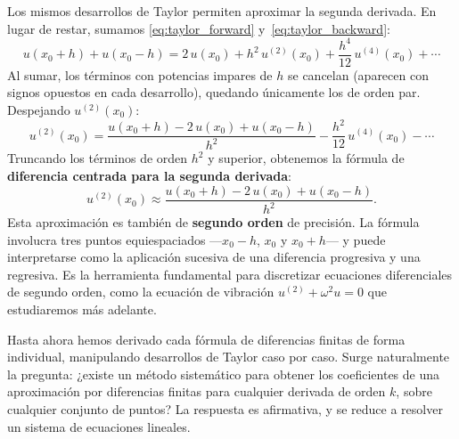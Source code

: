 Los mismos desarrollos de Taylor permiten aproximar la segunda derivada. En lugar de restar, sumamos
\eqref{eq:taylor_forward} y~\eqref{eq:taylor_backward}:
\begin{equation}
    u(x_0 + h) + u(x_0 - h) = 2\,u(x_0) + h^2\,u^{(2)}(x_{0}) + \frac{h^4}{12}\,u^{(4)}(x_{0}) + \cdots
    \label{eq:taylor_sum}
\end{equation}
Al sumar, los términos con potencias impares de $h$ se cancelan (aparecen con signos opuestos en cada desarrollo),
quedando únicamente los de orden par. Despejando $u^{(2)}(x_0)$:
\begin{equation}
    u^{(2)}(x_{0}) = \frac{u(x_0 + h) - 2\,u(x_0) + u(x_0 - h)}{h^2} - \frac{h^2}{12}\,u^{(4)}(x_{0}) - \cdots
    \label{eq:second_derivative_full}
\end{equation}
Truncando los términos de orden $h^2$ y superior, obtenemos la fórmula de \textbf{diferencia centrada para la segunda
    derivada}:
\begin{equation}
    u^{(2)}(x_{0}) \approx \frac{u(x_0 + h) - 2\,u(x_0) + u(x_0 - h)}{h^2}.
    \label{eq:centered_second_derivative}
\end{equation}
Esta aproximación es también de \textbf{segundo orden} de precisión. La fórmula involucra tres puntos equiespaciados
---$x_0 - h$, $x_0$ y $x_0 + h$--- y puede interpretarse como la aplicación sucesiva de una diferencia progresiva y
una regresiva. Es la herramienta fundamental para discretizar ecuaciones diferenciales de segundo orden, como la
ecuación de vibración $u^{(2)} + \omega^2 u = 0$ que estudiaremos más adelante.

Hasta ahora hemos derivado cada fórmula de diferencias finitas de forma individual, manipulando desarrollos de Taylor
caso por caso. Surge naturalmente la pregunta: ¿existe un método sistemático para obtener los coeficientes de una
aproximación por diferencias finitas para cualquier derivada de orden $k$, sobre cualquier conjunto de puntos? La
respuesta es afirmativa, y se reduce a resolver un sistema de ecuaciones lineales.


